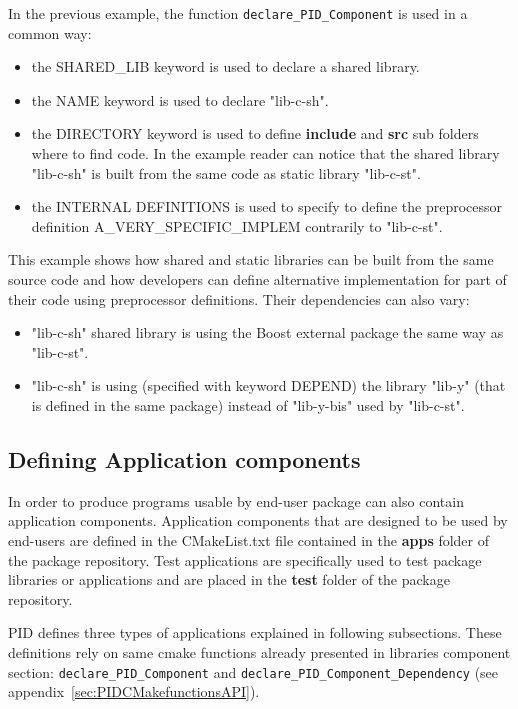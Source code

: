 \documentclass[12pt,a4paper]{article}
\begin{document}
In the previous example, the function \texttt{declare\_PID\_Component} is used in a common way:
\begin{itemize}
\item the SHARED\_LIB keyword is used to declare a shared library.
\item the NAME keyword is used to declare "lib-c-sh".
\item the DIRECTORY keyword is used to define \textbf{include} and \textbf{src} sub folders where to find code. In the example reader can notice that the shared library "lib-c-sh" is built from the same code as static library "lib-c-st".
\item the INTERNAL DEFINITIONS is used to specify to define the preprocessor definition A\_VERY\_SPECIFIC\_IMPLEM contrarily to "lib-c-st".
\end{itemize}

This example shows how shared and static libraries can be built from the same source code and how developers can define alternative implementation for part of their code using preprocessor definitions. Their dependencies can also vary:
\begin{itemize}
\item "lib-c-sh" shared library is using the Boost external package the same way as "lib-c-st".
\item "lib-c-sh" is using (specified with keyword DEPEND) the library "lib-y" (that is defined in the same package)  instead of "lib-y-bis" used by "lib-c-st".
\end{itemize}


\subsection{Defining Application components}
\label{sec:appCMake}

In order to produce programs usable by end-user package can also contain application components. Application components that are designed to be used by end-users are defined in the CMakeList.txt file contained in the \textbf{apps} folder of the package repository. Test applications are specifically used to test package libraries or applications and are placed in the \textbf{test} folder of the package repository.

PID defines three types of applications explained in following subsections. These definitions rely on same cmake functions already presented in libraries component section: \texttt{declare\_PID\_Component} and \texttt{declare\_PID\_Component\_Dependency} (see appendix~\ref{sec:PIDCMakefunctionsAPI}).
\end{document}
